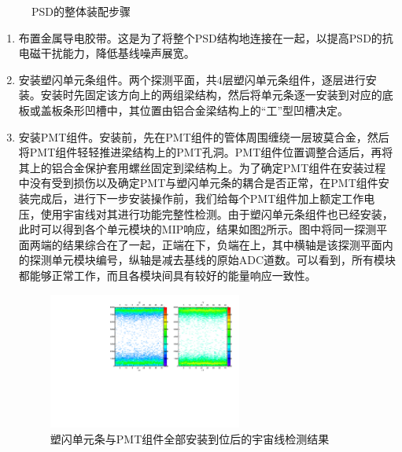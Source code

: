 \begin{figure}[htb]
{}
\caption{PSD的整体装配步骤}
\label{fig:construction:psd_assembly}
\end{figure}
%
\begin{enumerate}[label={\alph*)}]
	\item 布置金属导电胶带。这是为了将整个PSD结构地连接在一起，以提高PSD的抗电磁干扰能力，降低基线噪声展宽。
	\item 安装塑闪单元条组件。两个探测平面，共4层塑闪单元条组件，逐层进行安装。安装时先固定该方向上的两组梁结构，然后将单元条逐一安装到对应的底板或盖板条形凹槽中，其位置由铝合金梁结构上的“工”型凹槽决定。
	\item 安装PMT组件。安装前，先在PMT组件的管体周围缠绕一层玻莫合金，然后将PMT组件轻轻推进梁结构上的PMT孔洞。PMT组件位置调整合适后，再将其上的铝合金保护套用螺丝固定到梁结构上。为了确定PMT组件在安装过程中没有受到损伤以及确定PMT与塑闪单元条的耦合是否正常，在PMT组件安装完成后，进行下一步安装操作前，我们给每个PMT组件加上额定工作电压，使用宇宙线对其进行功能完整性检测。由于塑闪单元条组件也已经安装，此时可以得到各个单元模块的MIP响应，结果如图\ref{fig:construction:mipVSstrip}所示。图中将同一探测平面两端的结果综合在了一起，正端在下，负端在上，其中横轴是该探测平面内的探测单元模块编号，纵轴是减去基线的原始ADC道数。可以看到，所有模块都能够正常工作，而且各模块间具有较好的能量响应一致性。
	\begin{figure}[htbp]
	\centering
	\includegraphics[width=0.6\textwidth,angle=-90]{chap/construction/fig/mipVSstrip.pdf}
	\caption{塑闪单元条与PMT组件全部安装到位后的宇宙线检测结果}
	\label{fig:construction:mipVSstrip}
	\end{figure}


\end{enumerate}
